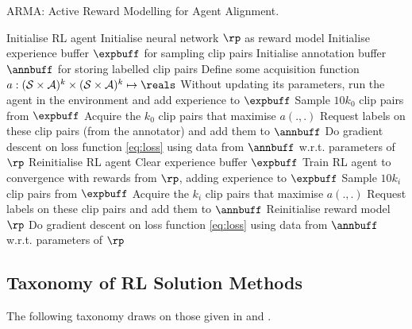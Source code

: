\begin{algorithm}
	\caption{ARMA: Active Reward Modelling for Agent Alignment.}
	\label{alg:arma}
	\begin{algorithmic}[1]
        \State Initialise RL agent
		\State Initialise neural network $ \rp $ as reward model
		\State Initialise experience buffer $ \expbuff $ for sampling clip pairs
		\State Initialise annotation buffer $ \annbuff $ for storing labelled clip pairs
		\State Define some acquisition function $ a : (\mathcal{S} \times \mathcal{A})^k \times (\mathcal{S} \times \mathcal{A})^k \mapsto \reals $
		\State Without updating its parameters, run the agent in the environment and add experience to $ \expbuff $
		\State Sample $ 10k_0 $ clip pairs from $ \expbuff $
		\State Acquire the $ k_0 $ clip pairs that maximise $ a(.,.) $
		\State Request labels on these clip pairs (from the annotator) and add them to $ \annbuff $
		\State Do gradient descent on loss function \ref{eq:loss} using data from $ \annbuff $ w.r.t. parameters of $ \rp $
		\State Reinitialise RL agent
		\State Clear experience buffer $ \expbuff $
		\State Train RL agent to convergence with rewards from $ \rp $, adding experience to $ \expbuff $
		\State Sample $ 10k_i $ clip pairs from $ \expbuff $
		\State Acquire the $ k_i $ clip pairs that maximise $ a(.,.) $
		\State Request labels on these clip pairs and add them to $ \annbuff $
		\State Reinitialise reward model $ \rp $
		\State Do gradient descent on loss function \ref{eq:loss} using data from $ \annbuff $ w.r.t. parameters of $ \rp $
		\EndFor
	\end{algorithmic}
\end{algorithm}

\subsection{Taxonomy of RL Solution Methods} \label{subsection:rl_taxonomy}
The following taxonomy draws on those given in \cite{Sutton2018} and \cite{Achiam2019}.
